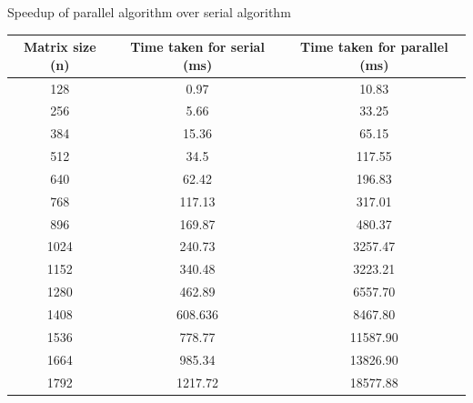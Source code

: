 \documentclass[12pt]{article}
\begin{document}
\begin{section}{Speedup of parallel algorithm over serial algorithm}
 \begin{center}
     \begin{tabular}{|c | c | c|}
         \hline
         \textbf{Matrix size (n)} & \textbf{Time taken for serial (ms)} & \textbf{Time taken for parallel (ms)} \\ [0.5ex]
         \hline
         128                      & 0.97                                & 10.83                                 \\
         \hline
         256                      & 5.66                                & 33.25                                 \\
         \hline
         384                      & 15.36                               & 65.15                                 \\
         \hline
         512                      & 34.5                                & 117.55                                \\
         \hline
         640                      & 62.42                               & 196.83                                \\
         \hline
         768                      & 117.13                              & 317.01                                \\
         \hline
         896                      & 169.87                              & 480.37                                \\
         \hline
         1024                     & 240.73                              & 3257.47                               \\
         \hline
         1152                     & 340.48                              & 3223.21                               \\
         \hline
         1280                     & 462.89                              & 6557.70                               \\
         \hline
         1408                     & 608.636                             & 8467.80                               \\ [1ex]
         \hline
         1536                     & 778.77                              & 11587.90                              \\ [1ex]
         \hline
         1664                     & 985.34                              & 13826.90                              \\ [1ex]
         \hline
         1792                     & 1217.72                             & 18577.88                              \\ [1ex]
         \hline
     \end{tabular}
 \end{center}


\end{section}
\end{document}
